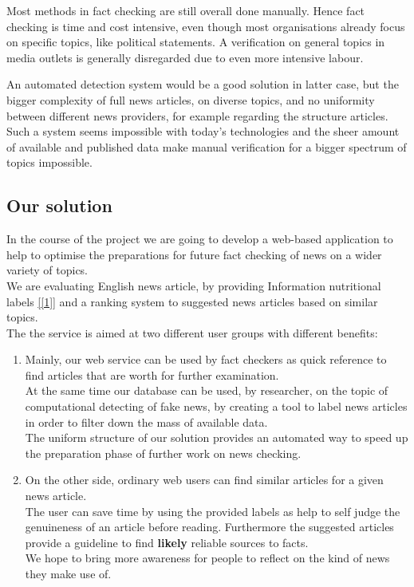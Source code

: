 \documentclass[10pt]{article}
\begin{document}
Most methods in fact checking are still overall done manually. 
Hence fact checking is time and cost intensive, even though most organisations already focus on specific topics, like political statements.
A verification on general topics in media outlets is generally disregarded due to even more intensive labour.

An automated detection system would be a good solution in latter case, but the bigger complexity of full news articles, on diverse topics, and no uniformity between different news providers, for example regarding the structure articles. Such a system seems impossible with today's technologies and the sheer amount of available and published data make manual verification for a bigger spectrum of topics impossible.

\subsection{Our solution}
In the course of the project we are going to develop a web-based application to help to optimise the preparations for future fact checking of news on a wider variety of topics.\\
We are evaluating English news article, by providing \grqq{}Information nutritional labels\grqq{} \ref{[1]} and a ranking system to suggested news articles based on similar topics.\\
The the service is aimed at two different user groups with different benefits:
\begin{enumerate}
\item Mainly, our web service can be used by fact checkers as quick reference to find articles that are worth for further examination. \\
At the same time our database can be used, by researcher, on the topic of computational detecting of fake news, by creating a tool to label news articles in order to filter down the mass of available data.\\
The uniform structure of our solution provides an automated way to speed up the preparation phase of further work on news checking.
\item On the other side, ordinary web users can find similar articles for a given news article.\\
The user can save time by using the provided labels as help to self judge the genuineness of an article before reading.
Furthermore the suggested articles provide a guideline to find \textbf{likely} reliable sources to facts.\\
We hope to bring more awareness for people to reflect on the kind of news they make use of.
\end{enumerate}
\end{document}
